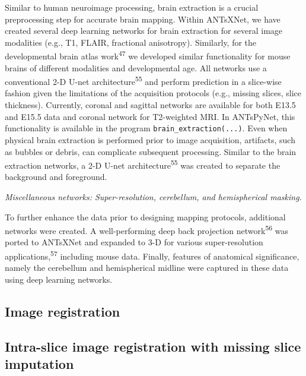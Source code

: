 \documentclass[
  12pt,
]{article}
\begin{document}
Similar to human neuroimage processing, brain extraction is a crucial
preprocessing step for accurate brain mapping. Within ANTsXNet, we have
created several deep learning networks for brain extraction for several
image modalities (e.g., T1, FLAIR, fractional anisotropy). Similarly,
for the developmental brain atlas work\textsuperscript{47} we developed
similar functionality for mouse brains of different modalities and
developmental age. All networks use a conventional 2-D U-net
architecture\textsuperscript{55} and perform prediction in a slice-wise
fashion given the limitations of the acquisition protocols (e.g.,
missing slices, slice thickness). Currently, coronal and sagittal
networks are available for both E13.5 and E15.5 data and coronal network
for T2-weighted MRI. In ANTsPyNet, this functionality is available in
the program \texttt{brain\_extraction(...)}. Even when physical brain
extraction is performed prior to image acquisition, artifacts, such as
bubbles or debris, can complicate subsequent processing. Similar to the
brain extraction networks, a 2-D U-net architecture\textsuperscript{55}
was created to separate the background and foreground.

\emph{Miscellaneous networks: Super-resolution, cerebellum, and
hemispherical masking.}

To further enhance the data prior to designing mapping protocols,
additional networks were created. A well-performing deep back projection
network\textsuperscript{56} was ported to ANTsXNet and expanded to 3-D
for various super-resolution applications,\textsuperscript{57} including
mouse data. Finally, features of anatomical significance, namely the
cerebellum and hemispherical midline were captured in these data using
deep learning networks.

\hypertarget{image-registration}{%
\subsection*{Image registration}\label{image-registration}}

\hypertarget{intra-slice-image-registration-with-missing-slice-imputation}{%
\subsection*{Intra-slice image registration with missing slice
imputation}\label{intra-slice-image-registration-with-missing-slice-imputation}}
\end{document}
